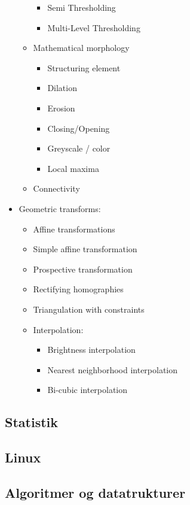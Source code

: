 \documentclass[a4paper,11pt]{article}
\begin{document}
\begin{itemize}
\begin{itemize}
\begin{itemize}
                    \item Semi Thresholding 
                    \item Multi-Level Thresholding 
                \end{itemize}
            \item Mathematical morphology
                \begin{itemize}
                    \item Structuring element
                    \item Dilation
                    \item Erosion
                    \item Closing/Opening
                    \item Greyscale / color
                    \item Local maxima
                \end{itemize}
            \item Connectivity 
        \end{itemize}
    \item Geometric transforms:
        \begin{itemize}
            \item Affine transformations
            \item Simple affine transformation 
            \item Prospective transformation
            \item Rectifying homographies
            \item Triangulation with constraints
            \item Interpolation:
                \begin{itemize}
                    \item Brightness interpolation
                    \item Nearest neighborhood interpolation
                    \item Bi-cubic interpolation
                \end{itemize}
        \end{itemize}
\end{itemize}

\subsection{Statistik}
\subsection{Linux}
\subsection{Algoritmer og datatrukturer}
\end{document}
